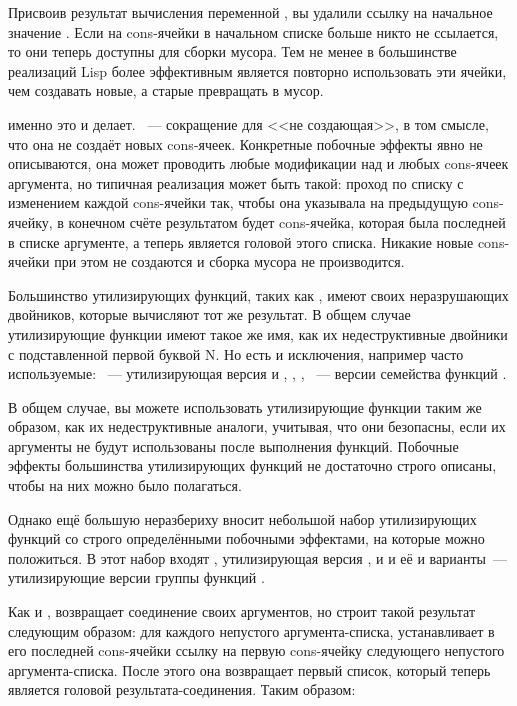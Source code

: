 Присвоив результат вычисления переменной , вы удалили ссылку на начальное
значение . Если на cons-ячейки в начальном списке больше никто не ссылается,
то они теперь доступны для сборки мусора. Тем не менее в большинстве реализаций Lisp более
эффективным является повторно использовать эти ячейки, чем создавать новые, а старые
превращать в мусор.

 именно это и делает. ~--- сокращение для <<не создающая>>, в том
смысле, что она не создаёт новых cons-ячеек. Конкретные побочные эффекты 
явно не описываются, она может проводить любые модификации над  и 
любых cons-ячеек аргумента, но типичная реализация может быть такой: проход по списку с
изменением  каждой cons-ячейки так, чтобы она указывала на предыдущую
cons-ячейку, в конечном счёте результатом будет cons-ячейка, которая была последней в
списке аргументе, а теперь является головой этого списка. Никакие новые cons-ячейки при
этом не создаются и сборка мусора не производится.

Большинство утилизирующих функций, таких как , имеют своих неразрушающих
двойников, которые вычисляют тот же результат. В общем случае утилизирующие функции имеют
такое же имя, как их недеструктивные двойники с подставленной первой буквой N. Но есть и
исключения, например часто используемые: ~--- утилизирующая версия
 и , , ,
~--- версии семейства функций .

В общем случае, вы можете использовать утилизирующие функции таким же образом, как их
недеструктивные аналоги, учитывая, что они безопасны, если их аргументы не будут
использованы после выполнения функций. Побочные эффекты большинства утилизирующих функций
не достаточно строго описаны, чтобы на них можно было полагаться.

Однако ещё большую неразбериху вносит небольшой набор утилизирующих функций со строго
определёнными побочными эффектами, на которые можно положиться. В этот набор входят
, утилизирующая версия , и  и её  и
 варианты~--- утилизирующие версии группы функций .

Как и ,  возвращает соединение своих аргументов, но строит такой
результат следующим образом: для каждого непустого аргумента-списка, 
устанавливает в  его последней cons-ячейки ссылку на первую cons-ячейку
следующего непустого аргумента-списка. После этого она возвращает первый список, который
теперь является головой результата-соединения. Таким образом:

